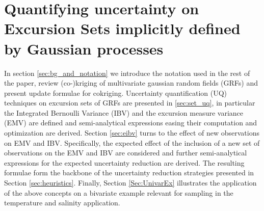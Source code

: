 \documentclass[aoas]{imsart}
\begin{document}
\section{Quantifying uncertainty on Excursion Sets implicitly defined by Gaussian processes}
\label{sec:ESEP}

In section \ref{sec:bg_and_notation} we introduce the notation used in the rest of the paper, review (co-)kriging of multivariate gaussian random fields (GRFs) and present update formulae for cokriging.
Uncertainty quantification (UQ) techniques on excursion sets of GRFs are presented in \ref{sec:set_uq}, in particular the Integrated Bernoulli Variance (IBV) and the excursion measure variance (EMV) are defined and semi-analytical expressions easing their computation and optimization are derived.
Section \ref{sec:eibv} turns to the  effect of new observations on EMV and IBV. Specifically, the expected effect of the inclusion of a new set of observations on the EMV and IBV are considered and further semi-analytical expressions for the expected 
uncertainty reduction are derived. The resulting formulae form the backbone of the uncertainty reduction strategies presented in Section \ref{sec:heuristics}.
Finally, Section \ref{Sec:UnivarEx} illustrates the application of the above concepts on a bivariate example relevant for sampling in the temperature and salinity application.
\end{document}
